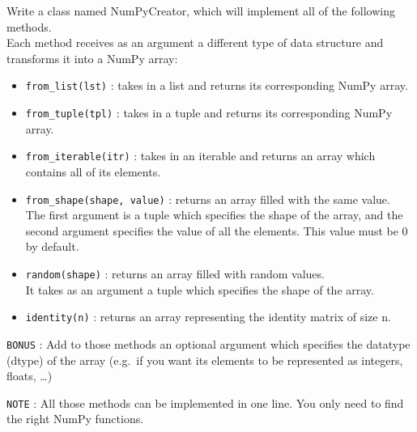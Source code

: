 \documentclass[]{article}
\begin{document}
Write a class named NumPyCreator, which will implement all of the
following methods.\\
Each method receives as an argument a different type of data structure
and transforms it into a NumPy array:

\begin{itemize}
\item
  \texttt{from\_list(lst)} : takes in a list and returns its
  corresponding NumPy array.
\item
  \texttt{from\_tuple(tpl)} : takes in a tuple and returns its
  corresponding NumPy array.
\item
  \texttt{from\_iterable(itr)} : takes in an iterable and returns an
  array which contains all of its elements.
\item
  \texttt{from\_shape(shape,\ value)} : returns an array filled with the
  same value.\\
  The first argument is a tuple which specifies the shape of the array,
  and the second argument specifies the value of all the elements. This
  value must be 0 by default.
\item
  \texttt{random(shape)} : returns an array filled with random values.\\
  It takes as an argument a tuple which specifies the shape of the
  array.
\item
  \texttt{identity(n)} : returns an array representing the identity
  matrix of size n.
\end{itemize}

\texttt{BONUS} : Add to those methods an optional argument which
specifies the datatype (dtype) of the array (e.g.~if you want its
elements to be represented as integers, floats, \ldots{})

\texttt{NOTE} : All those methods can be implemented in one line. You
only need to find the right NumPy functions.
\end{document}
